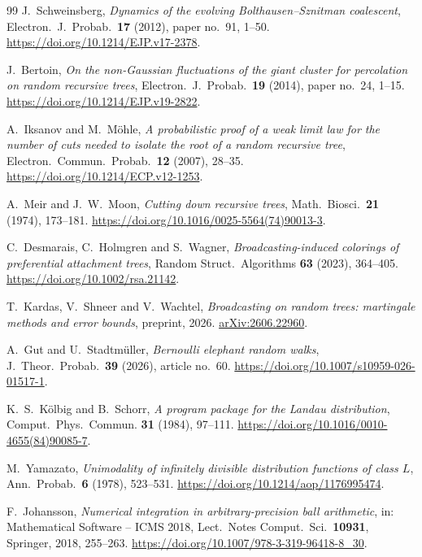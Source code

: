 \documentclass[EJP,preprint]{ejpecp}
\begin{document}
\begin{thebibliography}{99}
J.~Schweinsberg, \emph{Dynamics of the evolving Bolthausen--Sznitman
coalescent}, Electron.\ J.\ Probab.\ \textbf{17} (2012), paper no.~91, 1--50.
\url{https://doi.org/10.1214/EJP.v17-2378}.

J.~Bertoin, \emph{On the non-Gaussian fluctuations of the giant cluster for
percolation on random recursive trees}, Electron.\ J.\ Probab.\ \textbf{19}
(2014), paper no.~24, 1--15.
\url{https://doi.org/10.1214/EJP.v19-2822}.

A.~Iksanov and M.~M\"ohle, \emph{A probabilistic proof of a weak limit law for
the number of cuts needed to isolate the root of a random recursive tree},
Electron.\ Commun.\ Probab.\ \textbf{12} (2007), 28--35.
\url{https://doi.org/10.1214/ECP.v12-1253}.

A.~Meir and J.~W.~Moon, \emph{Cutting down recursive trees}, Math.\ Biosci.\
\textbf{21} (1974), 173--181.
\url{https://doi.org/10.1016/0025-5564(74)90013-3}.

C.~Desmarais, C.~Holmgren and S.~Wagner, \emph{Broadcasting-induced colorings
of preferential attachment trees}, Random Struct.\ Algorithms \textbf{63}
(2023), 364--405.
\url{https://doi.org/10.1002/rsa.21142}.

T.~Kardas, V.~Shneer and V.~Wachtel, \emph{Broadcasting on random trees:
martingale methods and error bounds}, preprint, 2026.
\href{https://arxiv.org/abs/2606.22960}{arXiv:2606.22960}.

A.~Gut and U.~Stadtm\"uller, \emph{Bernoulli elephant random walks}, J.\
Theor.\ Probab.\ \textbf{39} (2026), article no.~60.
\url{https://doi.org/10.1007/s10959-026-01517-1}.

K.~S.~K\"olbig and B.~Schorr, \emph{A program package for the Landau
distribution}, Comput.~Phys.~Commun. \textbf{31} (1984), 97--111.
\url{https://doi.org/10.1016/0010-4655(84)90085-7}.

M.~Yamazato, \emph{Unimodality of infinitely divisible distribution
functions of class $L$}, Ann.\ Probab.\ \textbf{6} (1978), 523--531.
\url{https://doi.org/10.1214/aop/1176995474}.

F.~Johansson, \emph{Numerical integration in arbitrary-precision ball
arithmetic}, in: Mathematical Software -- ICMS 2018, Lect.\ Notes
Comput.\ Sci.\ \textbf{10931}, Springer, 2018, 255--263.
\url{https://doi.org/10.1007/978-3-319-96418-8_30}.


\end{thebibliography}
\end{document}
